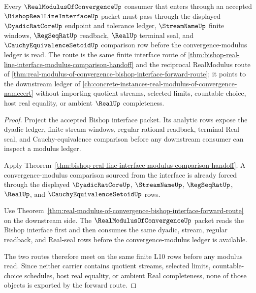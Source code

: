 \begin{theorem}
\label{thm:bishop-real-line-interface-real-modulus-forward-route}
Every $\RealModulusOfConvergenceUp$ consumer that enters through an accepted $\BishopRealLineInterfaceUp$ packet must pass through the displayed $\DyadicRatCoreUp$ endpoint and tolerance ledger, $\StreamNameUp$ finite windows, $\RegSeqRatUp$ readback, $\RealUp$ terminal seal, and $\CauchyEquivalenceSetoidUp$ comparison row before the convergence-modulus ledger is read. The route is the same finite interface route of \autoref{thm:bishop-real-line-interface-modulus-comparison-handoff} and the reciprocal RealModulus route of \autoref{thm:real-modulus-of-convergence-bishop-interface-forward-route}; it points to the downstream ledger of \autoref{ch:concrete-instances-real-modulus-of-convergence-namecert} without importing quotient streams, selected limits, countable choice, host real equality, or ambient $\RealUp$ completeness.
\end{theorem}
\begin{proof}
Project the accepted Bishop interface packet. Its analytic rows expose the dyadic ledger, finite stream windows, regular rational readback, terminal Real seal, and Cauchy-equivalence comparison before any downstream consumer can inspect a modulus ledger.

Apply Theorem~\ref{thm:bishop-real-line-interface-modulus-comparison-handoff}. A convergence-modulus comparison sourced from the interface is already forced through the displayed $\DyadicRatCoreUp$, $\StreamNameUp$, $\RegSeqRatUp$, $\RealUp$, and $\CauchyEquivalenceSetoidUp$ rows.

Use Theorem~\ref{thm:real-modulus-of-convergence-bishop-interface-forward-route} on the downstream side. The $\RealModulusOfConvergenceUp$ packet reads the Bishop interface first and then consumes the same dyadic, stream, regular readback, and Real-seal rows before the convergence-modulus ledger is available.

The two routes therefore meet on the same finite L10 rows before any modulus read. Since neither carrier contains quotient streams, selected limits, countable-choice schedules, host real equality, or ambient Real completeness, none of those objects is exported by the forward route.
\end{proof}
